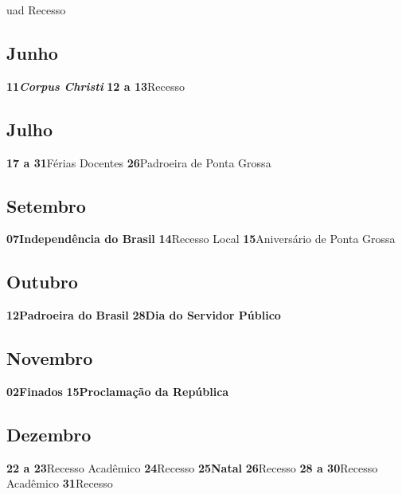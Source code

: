 \documentclass[thesis]{hmcposter}
\begin{document}
\begin{poster}
uad Recesso \newline\subsection{Junho}\textbf{11}\quad \quad \quad \quad \textbf{\textit{Corpus Christi}} \newline\textbf{12 a 13}\quad \quad Recesso \newline\subsection{Julho}\textbf{17 a 31}\quad \quad Férias Docentes \newline\textbf{26}\quad \quad \quad \quad Padroeira de Ponta Grossa \newline\subsection{Setembro}\textbf{07}\quad \quad \quad \quad \textbf{Independência do Brasil} \newline\textbf{14}\quad \quad \quad \quad Recesso Local \newline\textbf{15}\quad \quad \quad \quad Aniversário de Ponta Grossa \newline\subsection{Outubro}\textbf{12}\quad \quad \quad \quad \textbf{Padroeira do Brasil} \newline\textbf{28}\quad \quad \quad \quad \textbf{Dia do Servidor Público} \newline\subsection{Novembro}\textbf{02}\quad \quad \quad \quad \textbf{Finados} \newline\textbf{15}\quad \quad \quad \quad \textbf{Proclamação da República} \newline\subsection{Dezembro}\textbf{22 a 23}\quad \quad Recesso Acadêmico \newline\textbf{24}\quad \quad \quad \quad Recesso \newline\textbf{25}\quad \quad \quad \quad \textbf{Natal} \newline\textbf{26}\quad \quad \quad \quad Recesso \newline\textbf{28 a 30}\quad \quad Recesso Acadêmico \newline\textbf{31}\quad \quad \quad \quad Recesso \newline\newpage

\end{poster}
\end{document}
